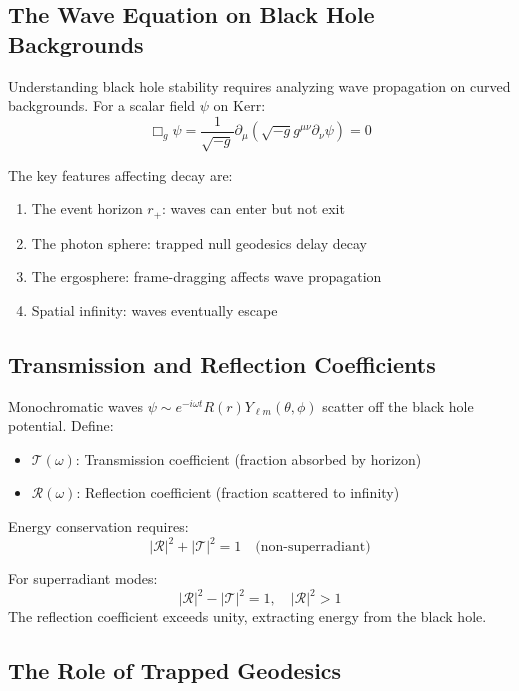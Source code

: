 \documentclass[12pt,a4paper]{article}
\begin{document}
\subsection{The Wave Equation on Black Hole Backgrounds}

Understanding black hole stability requires analyzing wave propagation on curved backgrounds. For a scalar field $\psi$ on Kerr:
\begin{equation}
\Box_g \psi = \frac{1}{\sqrt{-g}}\partial_\mu\left(\sqrt{-g}g^{\mu\nu}\partial_\nu\psi\right) = 0
\end{equation}

The key features affecting decay are:
\begin{enumerate}
    \item The event horizon $r_+$: waves can enter but not exit
    \item The photon sphere: trapped null geodesics delay decay
    \item The ergosphere: frame-dragging affects wave propagation
    \item Spatial infinity: waves eventually escape
\end{enumerate}

\subsection{Transmission and Reflection Coefficients}

Monochromatic waves $\psi \sim e^{-i\omega t}R(r)Y_{\ell m}(\theta, \phi)$ scatter off the black hole potential. Define:
\begin{itemize}
    \item $\mathcal{T}(\omega)$: Transmission coefficient (fraction absorbed by horizon)
    \item $\mathcal{R}(\omega)$: Reflection coefficient (fraction scattered to infinity)
\end{itemize}

Energy conservation requires:
\begin{equation}
|\mathcal{R}|^2 + |\mathcal{T}|^2 = 1 \quad \text{(non-superradiant)}
\end{equation}

For superradiant modes:
\begin{equation}
|\mathcal{R}|^2 - |\mathcal{T}|^2 = 1, \quad |\mathcal{R}|^2 > 1
\end{equation}
The reflection coefficient exceeds unity, extracting energy from the black hole.

\subsection{The Role of Trapped Geodesics}
\end{document}
